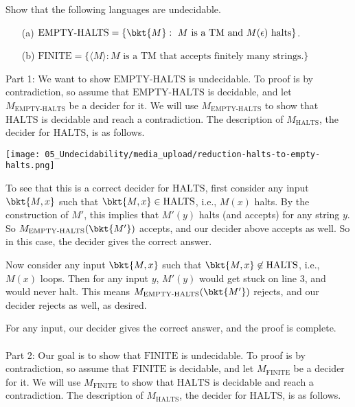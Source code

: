 \begin{flex}
\begin{exercise}  \label{exercise:Practice-with-undecidability-proofs}
Show that the following languages are undecidable.
\begin{enumerate}
    \item[(a)] $\text{EMPTY-HALTS} = \{\bkt{M} : \text{ $M$ is a TM and $M(\epsilon)$ halts}\}$.
    \item[(b)] $\text{FINITE} = \{\langle M \rangle : \text{$M$ is a TM that accepts finitely many strings.}\}$
\end{enumerate}
\end{exercise}

\begin{solution}
Part 1: We want to show $\text{EMPTY-HALTS}$ is undecidable. To proof is by contradiction, so assume that $\text{EMPTY-HALTS}$ is decidable, and let $M_{\text{EMPTY-HALTS}}$ be a decider for it. We will use $M_{\text{EMPTY-HALTS}}$ to show that $\text{HALTS}$ is decidable and reach a contradiction. The description of $M_{\text{HALTS}}$, the decider for $\text{HALTS}$, is as follows.

\begin{center}
\texttt{[image: 05\_Undecidability/media\_upload/reduction-halts-to-empty-halts.png]}
\end{center}

To see that this is a correct decider for $\text{HALTS}$, first consider any input $\bkt{M,x}$ such that $\bkt{M,x} \in \text{HALTS}$, i.e., $M(x)$ halts. By the construction of $M'$, this implies that $M'(y)$ halts (and accepts) for any string $y$. So $M_\text{EMPTY-HALTS}(\bkt{M'})$ accepts, and our decider above accepts as well. So in this case, the decider gives the correct answer.

Now consider any input $\bkt{M,x}$ such that $\bkt{M,x} \not\in \text{HALTS}$, i.e., $M(x)$ loops. Then for any input $y$, $M'(y)$ would get stuck on line 3, and would never halt. This means $M_\text{EMPTY-HALTS}(\bkt{M'})$ rejects, and our decider rejects as well, as desired.

For any input, our decider gives the correct answer, and the proof is complete.
\\\\
\noindent
Part 2: Our goal is to show that $\text{FINITE}$ is undecidable. To proof is by contradiction, so assume that $\text{FINITE}$ is decidable, and let $M_\text{FINITE}$ be a decider for it. We will use $M_\text{FINITE}$ to show that $\text{HALTS}$ is decidable and reach a contradiction. The description of $M_{\text{HALTS}}$, the decider for $\text{HALTS}$, is as follows.


\end{solution}
\end{flex}
